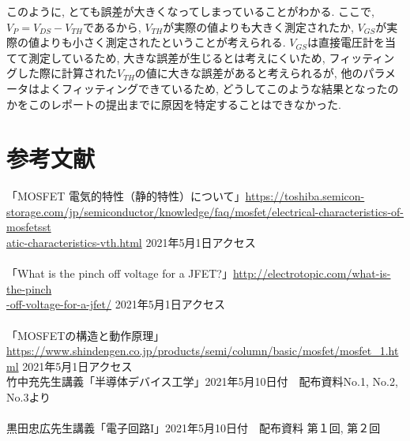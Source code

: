 \documentclass[a4j,dvipdfmx,titlepage]{article}
\begin{document}
このように, とても誤差が大きくなってしまっていることがわかる. ここで, $V_{P} = V_{DS} - V_{TH}$であるから, $V_{TH}$が実際の値よりも大きく測定されたか, $V_{GS}$が実際の値よりも小さく測定されたということが考えられる. $V_{GS}$は直接電圧計を当てて測定しているため, 大きな誤差が生じるとは考えにくいため, フィッティングした際に計算された$V_{TH}$の値に大きな誤差があると考えられるが, 他のパラメータはよくフィッティングできているため, どうしてこのような結果となったのかをこのレポートの提出までに原因を特定することはできなかった. 

\section{参考文献}
「MOSFET 電気的特性（静的特性）について」\url{https://toshiba.semicon-storage.com/jp/semiconductor/knowledge/faq/mosfet/electrical-characteristics-of-mosfetsst}\\\url{atic-characteristics-vth.html} 2021年5月1日アクセス\\~\\
「What is the pinch off voltage for a JFET?」\url{http://electrotopic.com/what-is-the-pinch}\\\url{-off-voltage-for-a-jfet/} 2021年5月1日アクセス\\~\\
「MOSFETの構造と動作原理」 \url{https://www.shindengen.co.jp/products/semi/column/basic/mosfet/mosfet_1.html} 2021年5月1日アクセス\\
竹中充先生講義「半導体デバイス工学」2021年5月10日付　配布資料No.1, No.2, No.3より\\~\\
黒田忠広先生講義「電子回路I」2021年5月10日付　配布資料 第１回, 第２回
\end{document}
